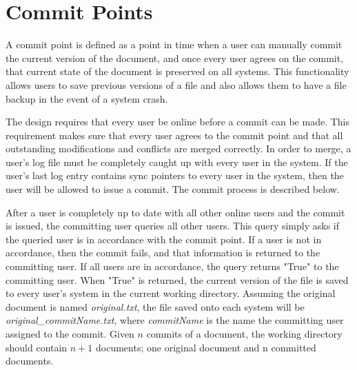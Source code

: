 \section{Commit Points}

A commit point is defined as a point in time when a user can manually commit the current version of the document, and once every user agrees on the commit, that current state of the document is preserved on all systems.  This functionality allows users to save previous versions of a file and also allows them to have a file backup in the event of a system crash.

The design requires that every user be online before a commit can be made. This requirement makes sure that every user agrees to the commit point and that all outstanding modifications and conflicts are merged correctly. In order to merge, a user's log file must be completely caught up with every user in the system. If the user's last log entry contains sync pointers to every user in the system, then the user will be allowed to issue a commit. The commit process is described below.

After a user is completely up to date with all other online users and the commit is issued, the committing user queries all other users. This query simply asks if the queried user is in accordance with the commit point. If a user is not in accordance, then the commit fails, and that information is returned to the committing user. If all users are in accordance, the query returns "True" to the committing user. When "True" is returned, the current version of the file is saved to every user's system in the current working directory.  Assuming the original document is named \emph{original.txt}, the file saved onto each system will be \emph{original\_commitName.txt}, where \emph{commitName} is the name the committing user assigned to the commit. Given $n$ commits of a document, the working directory should contain $n+ 1$ documents; one original document and n committed documents.